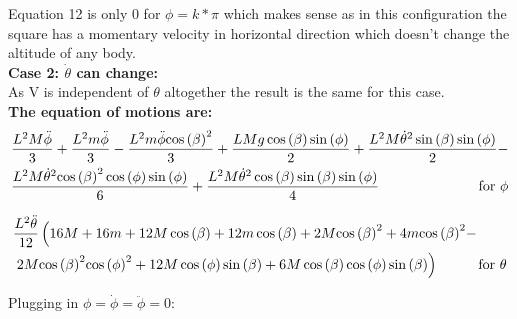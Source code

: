 \noindent Equation 12 is only 0 for $\phi = k*\pi$ which makes sense as in this configuration the square has a momentary velocity in horizontal direction which doesn't change the altitude of any body.\vspace{0.5cm}\\

\textbf{Case 2: $\dot\theta$ can change:} \vspace{0.3cm}\\

As V is independent of $\theta$ altogether the result is the same for this case.\vspace{3mm}\\

\noindent \textbf{The equation of motions are:}\vspace{3mm}\\
\begin{equation}
    \begin{split}
        &\frac{L^2M\mathrm{\ddot\phi}}{3}+\frac{L^2m\mathrm{\ddot\phi}}{3}-\frac{L^2m\mathrm{\ddot\phi}{\cos\left(\beta \right)}^2}{3}+\frac{LMg\cos\left(\beta \right)\sin\left(\phi \right)}{2}+\frac{L^2M{\mathrm{\dot\theta}}^2\sin\left(\beta \right)\sin\left(\phi \right)}{2}-\\
        &\frac{L^2M{\mathrm{\dot\theta}}^2{\cos\left(\beta \right)}^2\cos\left(\phi \right)\sin\left(\phi \right)}{6}+\frac{L^2M{\mathrm{\dot\theta}}^2\cos\left(\beta \right)\sin\left(\beta \right)\sin\left(\phi \right)}{4} \hspace{25mm} \text{for } \phi
    \end{split}
\end{equation}

\begin{equation}
    \begin{split}
        &\frac{L^2\mathrm{\ddot\theta}}{12}\left(16M+16m+12M\cos\left(\beta \right)+12m\cos\left(\beta \right)+2M{\cos\left(\beta \right)}^2+4m{\cos\left(\beta \right)}^2-\right.\\
        &\left.2M{\cos\left(\beta \right)}^2{\cos\left(\phi \right)}^2+12M\cos\left(\phi \right)\sin\left(\beta \right)+6M\cos\left(\beta \right)\cos\left(\phi \right)\sin\left(\beta \right)\right) \hspace{10mm}\text{for } \theta
    \end{split}
\end{equation}

Plugging in $\phi = \dot\phi = \ddot\phi = 0$:

